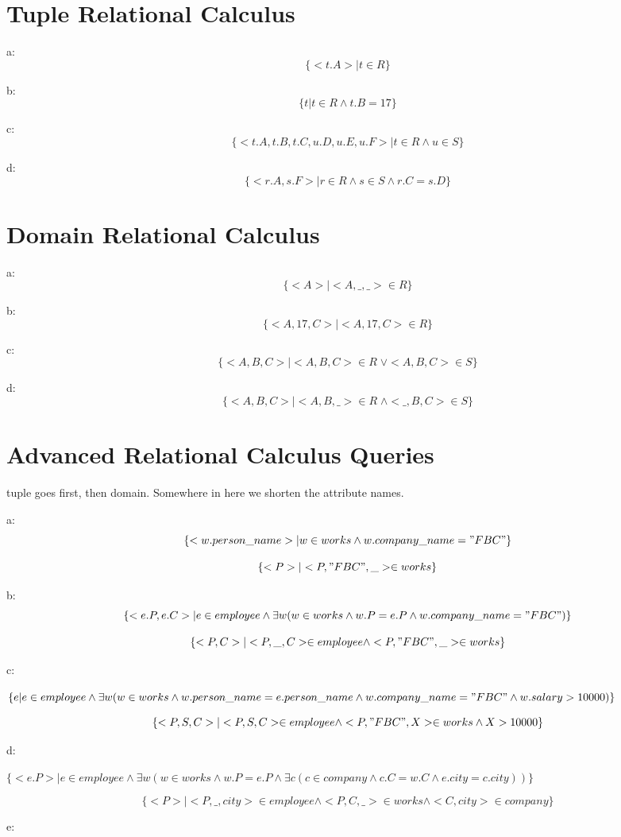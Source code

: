 \documentclass[12pt,a4paper,draft]{report}
\begin{document}
\section{Tuple Relational Calculus}
a:
$$\{<t.A>|t\in R\}$$

b:
$$\{t|t \in R \land t.B = 17 \}$$

c:
$$\{<t.A, t.B, t.C, u.D, u.E, u.F>| t \in R \land u \in S\}$$

d:
$$\{<r.A, s.F>| r \in R \land s \in S \land r.C = s.D \}$$

\section{Domain Relational Calculus}
a:
$$\{<A>|<A,\_,\_> \in R\}$$

b:
$$\{<A,17,C>|<A,17,C> \in R \}$$

c:
$$\{<A,B,C>|<A,B,C> \in R\; \lor <A,B,C> \in S\}$$

d:
$$\{<A,B,C>|<A,B,\_> \in R \;\land <\_,B,C> \in S\}$$

\section{Advanced Relational Calculus Queries}
tuple goes first, then domain. Somewhere in here we shorten the attribute names.

a:
$$\{<w.person\_name>| w \in works \land w.company\_name = "FBC"\}$$

$$\{<P>|<P, "FBC", \_> \in works\}$$

b:
$$\{<e.P, e.C>|e \in employee \land \exists w (w \in works \land w.P = e.P \land w.company\_name = "FBC")\}$$

$$\{<P,C>|<P,\_,C> \in employee \land <P,"FBC", \_> \in works\}$$

c:

$\{e|e \in employee \land \exists w (w \in works \land w.person\_name = e.person\_name \land w.company\_name = "FBC" \land w.salary > 10000)\}$

$$\{<P,S,C>|<P,S,C> \in employee \land <P,"FBC", X> \in works \land X > 10000\}$$

d:

$\{<e.P>| e \in employee  \land \exists w ( w \in works \land w.P = e.P \land \exists c( c \in company \land c.C = w.C \land e.city = c.city))\}$

$$\{<P>| <P,\_,city> \in employee \land <P,C,\_> \in works \land <C, city > \in company\}$$

e:
\end{document}
